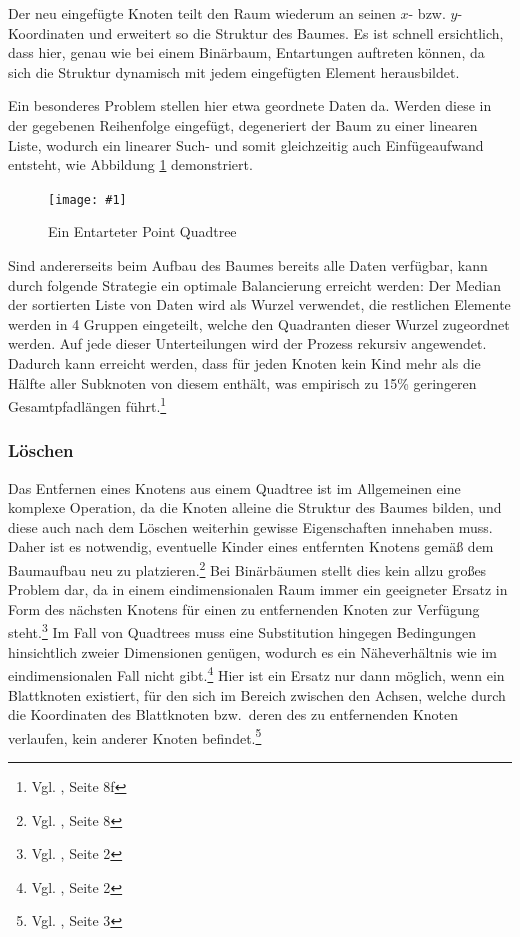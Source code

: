 \documentclass[%
			paper=a4,%
			DIV12,
			liststotoc,
			bibtotoc,
			draft=false,%
			titlepage,
			numbers=noendperiod
			]{scrartcl}
\newcommand{\zit}[3]{#1 \cite{#2}, #3}
\newcommand{\footzit}[3]{\footnote{\zit{#1}{#2}{#3}}}
\newcommand{\myfig}[5] {
 \begin{figure}[tbph]
	 \centering
	 \texttt{[image: \#1]}
	 \caption[#4]{#5}
	 \label{fig:#2}
 \end{figure}
}
\begin{document}
Der neu eingefügte Knoten teilt den Raum wiederum an seinen $x$- bzw. $y$-Koordinaten und erweitert so die Struktur des Baumes.  
Es ist schnell ersichtlich, dass hier, genau wie bei einem Binärbaum, Entartungen auftreten können, da sich die Struktur dynamisch mit jedem eingefügten Element herausbildet.

Ein besonderes Problem stellen hier etwa geordnete Daten da. Werden diese in der gegebenen Reihenfolge eingefügt, degeneriert der Baum zu einer linearen Liste, wodurch ein linearer Such- und somit gleichzeitig auch Einfügeaufwand entsteht, wie Abbildung \ref{fig:entartung} demonstriert.
\myfig{img/pointquadtree-entartet-trimmed}{entartung}{width=.6\textwidth}{Entarteter Point Quadtree}{Ein Entarteter Point Quadtree}

Sind andererseits beim Aufbau des Baumes bereits alle Daten verfügbar, kann durch folgende Strategie ein optimale Balancierung erreicht werden: Der Median der sortierten Liste von Daten wird als Wurzel verwendet, die restlichen Elemente werden in 4 Gruppen eingeteilt, welche den Quadranten dieser Wurzel zugeordnet werden.
Auf jede dieser Unterteilungen wird der Prozess rekursiv angewendet. Dadurch kann erreicht werden, dass für jeden Knoten kein Kind mehr als die Hälfte aller Subknoten von diesem enthält, was empirisch zu 15\% geringeren Gesamtpfadlängen führt.\footzit{Vgl.}{DBLP:journals/acta/FinkelB74}{Seite 8f}


\subsubsection{Löschen}
\label{sec:pointquadtree:delete}
Das Entfernen eines Knotens aus einem Quadtree ist im Allgemeinen eine komplexe Operation, da die Knoten alleine die Struktur des Baumes bilden, und diese auch nach dem Löschen weiterhin gewisse Eigenschaften innehaben muss.
Daher ist es notwendig, eventuelle Kinder eines entfernten Knotens gemäß dem Baumaufbau neu zu platzieren.\footzit{Vgl.}{DBLP:journals/acta/FinkelB74}{Seite 8}
Bei Binärbäumen stellt dies kein allzu großes Problem dar, da in einem eindimensionalen Raum immer ein geeigneter Ersatz in Form des nächsten Knotens für einen zu entfernenden Knoten zur Verfügung steht.\footzit{Vgl.}{DBLP:journals/cacm/Samet80a}{Seite 2}
Im Fall von Quadtrees muss eine Substitution hingegen Bedingungen hinsichtlich zweier Dimensionen genügen, wodurch es ein Näheverhältnis wie im eindimensionalen Fall nicht gibt.\footzit{Vgl.}{DBLP:journals/cacm/Samet80a}{Seite 2}
Hier ist ein Ersatz nur dann möglich, wenn ein Blattknoten existiert, für den sich im Bereich zwischen den Achsen, welche durch die Koordinaten des Blattknoten bzw.\ deren des zu entfernenden Knoten verlaufen, kein anderer Knoten befindet.\footzit{Vgl.}{DBLP:journals/cacm/Samet80a}{Seite 3}
\end{document}
